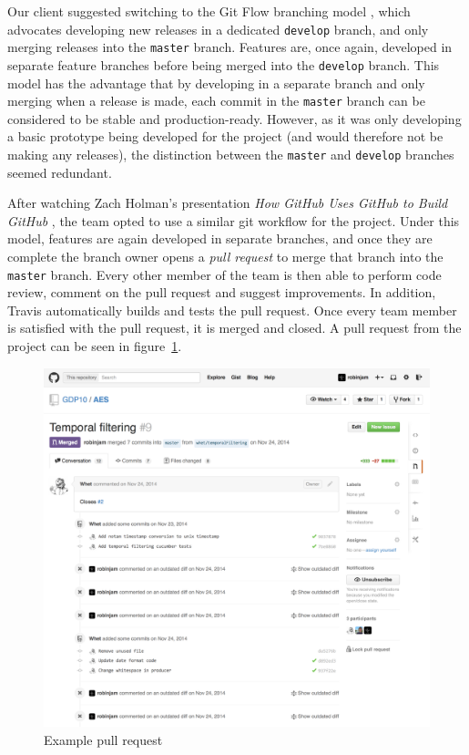 \documentclass[a4paper, 12pt, twoside]{article}
\begin{document}
Our client suggested switching to the Git Flow branching model \cite{Driessen2010}, which advocates developing new releases in a dedicated \texttt{develop} branch, and only merging releases into the \texttt{master} branch. Features are, once again, developed in separate feature branches before being merged into the \texttt{develop} branch. This model has the advantage that by developing in a separate branch and only merging when a release is made, each commit in the \texttt{master} branch can be considered to be stable and production-ready. However, as it was only developing a basic prototype being developed for the project (and would therefore not be making any releases), the distinction between the \texttt{master} and \texttt{develop} branches seemed redundant.

After watching Zach Holman's presentation \emph{How GitHub Uses GitHub to Build GitHub} \cite{hgugtbg}, the team opted to use a similar git workflow for the project. Under this model, features are again developed in separate branches, and once they are complete the branch owner opens a \emph{pull request} to merge that branch into the \texttt{master} branch. Every other member of the team is then able to perform code review, comment on the pull request and suggest improvements. In addition, Travis automatically builds and tests the pull request. Once every team member is satisfied with the pull request, it is merged and closed. A pull request from the project can be seen in figure~\ref{fig:pull_request}.

\begin{figure}
  \includegraphics[width=\linewidth]{pull_request.png}
  \caption{Example pull request}
  \label{fig:pull_request}
\end{figure}
\end{document}
